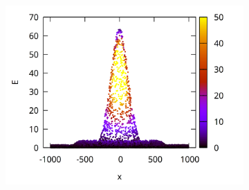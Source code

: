\documentclass[11pt]{article}
\begin{document}
\begin{figure}
\begin{subfigure}{0.33\textwidth}
\end{subfigure}%
\begin{subfigure}{0.33\textwidth}
    \centering
    \includegraphics[width=1.\textwidth]{img/energy_160.png}
\end{subfigure}




\end{figure}
\end{document}
